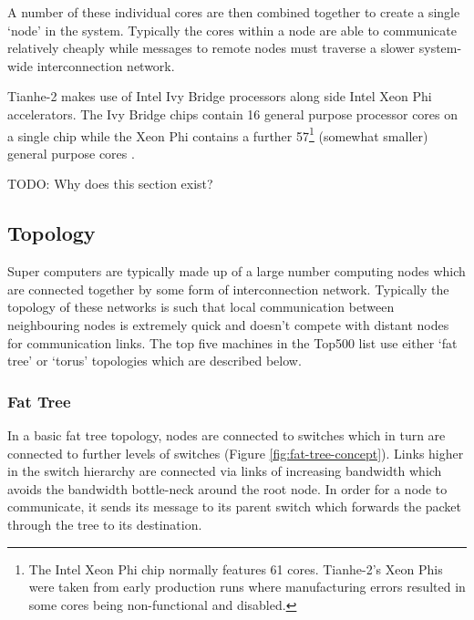 			A number of these individual cores are then combined together to create a
			single `node' in the system. Typically the cores within a node are able to
			communicate relatively cheaply while messages to remote nodes must
			traverse a slower system-wide interconnection network.
			
			Tianhe-2 makes use of Intel Ivy Bridge processors along side Intel Xeon
			Phi accelerators. The Ivy Bridge chips contain 16 general purpose
			processor cores on a single chip while the Xeon Phi contains a further
			57\footnote{The Intel Xeon Phi chip normally features 61 cores. Tianhe-2's
			Xeon Phis were taken from early production runs where manufacturing errors
			resulted in some cores being non-functional and disabled.} (somewhat
			smaller) general purpose cores \cite{dongarra13}.
			
			TODO: Why does this section exist?
		
		\subsection{Topology}
			
			
			Super computers are typically made up of a large number computing nodes
			which are connected together by some form of interconnection network.
			Typically the topology of these networks is such that local communication
			between neighbouring nodes is extremely quick and doesn't compete with
			distant nodes for communication links. The top five machines in the
			Top500 list use either `fat tree' or `torus' topologies which are
			described below.
			
			\subsubsection{Fat Tree}
			
				In a basic fat tree topology, nodes are connected to switches which in
				turn are connected to further levels of switches (Figure
				\ref{fig:fat-tree-concept}). Links higher in the switch hierarchy are
				connected via links of increasing bandwidth which avoids the bandwidth
				bottle-neck around the root node. In order for a node to communicate, it
				sends its message to its parent switch which forwards the packet through
				the tree to its destination.
				
